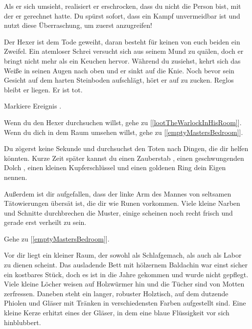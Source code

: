 Als er sich umsieht, realisiert er erschrocken, dass du nicht die Person bist, mit der er gerechnet hatte. Du spürst sofort, dass ein Kampf unvermeidbar ist und nutzt diese Überraschung, um zuerst anzugreifen!



Der Hexer ist dem Tode geweiht, daran besteht für keinen von euch beiden ein Zweifel. Ein atemloser Schrei versucht sich aus seinem Mund zu quälen, doch er bringt nicht mehr als ein Keuchen hervor. Während du zusiehst, kehrt sich das Weiße in seinen Augen nach oben und er sinkt auf die Knie. Noch bevor sein Gesicht auf dem harten Steinboden aufschlägt, hört er auf zu zucken. Reglos bleibt er liegen. Er ist tot.

Markiere Ereignis .

Wenn du den Hexer durchsuchen willst, gehe zu [\ref{lootTheWarlockInHisRoom}].
Wenn du dich in dem Raum umsehen willst, gehe zu [\ref{emptyMastersBedroom}].


Du zögerst keine Sekunde und durchsuchst den Toten nach Dingen, die dir helfen könnten.
Kurze Zeit später kannst du einen Zauberstab , einen geschwungenden Dolch , einen kleinen Kupferschlüssel  und einen goldenen Ring  dein Eigen nennen.

Außerdem ist dir aufgefallen, dass der linke Arm des Mannes von seltsamen Tätowierungen übersät ist, die dir wie Runen vorkommen. Viele kleine Narben und Schnitte durchbrechen die Muster, einige scheinen noch recht frisch und gerade erst verheilt zu sein.

Gehe zu [\ref{emptyMastersBedroom}].


Vor dir liegt ein kleiner Raum, der sowohl als Schlafgemach, als auch als Labor zu dienen scheint.
Das ausladende Bett mit hölzernem Baldachin war einst sicher ein kostbares Stück, doch es ist in die Jahre gekommen und wurde nicht gepflegt. Viele kleine Löcher weisen auf Holzwürmer hin und die Tücher sind von Motten zerfressen. Daneben steht ein langer, robuster Holztisch, auf dem dutzende Phiolen und Gläser mit Tränken in verschiedensten Farben aufgestellt sind. Eine kleine Kerze erhitzt eines der Gläser, in dem eine blaue Flüssigkeit vor sich hinblubbert.

